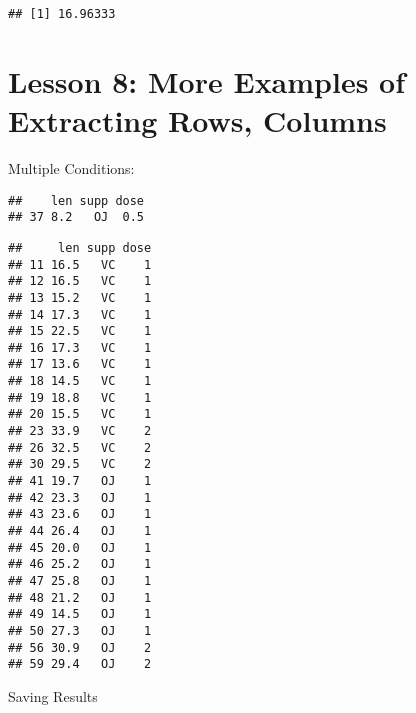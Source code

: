 \documentclass[
]{article}
\newenvironment{Shaded}{\begin{snugshade}}{\end{snugshade}}
\newcommand{\DecValTok}[1]{\textcolor[rgb]{0.00,0.00,0.81}{#1}}
\newcommand{\FloatTok}[1]{\textcolor[rgb]{0.00,0.00,0.81}{#1}}
\newcommand{\FunctionTok}[1]{\textcolor[rgb]{0.00,0.00,0.00}{#1}}
\newcommand{\NormalTok}[1]{#1}
\newcommand{\OtherTok}[1]{\textcolor[rgb]{0.56,0.35,0.01}{#1}}
\newcommand{\SpecialCharTok}[1]{\textcolor[rgb]{0.00,0.00,0.00}{#1}}
\newcommand{\StringTok}[1]{\textcolor[rgb]{0.31,0.60,0.02}{#1}}
\begin{document}
\begin{verbatim}
## [1] 16.96333
\end{verbatim}

\hypertarget{lesson-8-more-examples-of-extracting-rows-columns}{%
\section{Lesson 8: More Examples of Extracting Rows,
Columns}\label{lesson-8-more-examples-of-extracting-rows-columns}}

Multiple Conditions:

\begin{Shaded}
\end{Shaded}

\begin{verbatim}
##    len supp dose
## 37 8.2   OJ  0.5
\end{verbatim}

\begin{Shaded}
\end{Shaded}

\begin{verbatim}
##     len supp dose
## 11 16.5   VC    1
## 12 16.5   VC    1
## 13 15.2   VC    1
## 14 17.3   VC    1
## 15 22.5   VC    1
## 16 17.3   VC    1
## 17 13.6   VC    1
## 18 14.5   VC    1
## 19 18.8   VC    1
## 20 15.5   VC    1
## 23 33.9   VC    2
## 26 32.5   VC    2
## 30 29.5   VC    2
## 41 19.7   OJ    1
## 42 23.3   OJ    1
## 43 23.6   OJ    1
## 44 26.4   OJ    1
## 45 20.0   OJ    1
## 46 25.2   OJ    1
## 47 25.8   OJ    1
## 48 21.2   OJ    1
## 49 14.5   OJ    1
## 50 27.3   OJ    1
## 56 30.9   OJ    2
## 59 29.4   OJ    2
\end{verbatim}

Saving Results

\begin{Shaded}
\end{Shaded}
\end{document}
